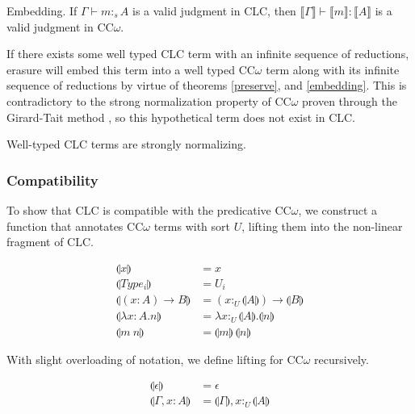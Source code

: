 \documentclass[sigplan,screen,review,anonymous]{acmart}
\newcommand{\utype}{:_{\scriptscriptstyle U}}
\newcommand{\stype}[1]{:_#1}
\newcommand{\erase}[1]{\llbracket #1 \rrbracket}
\newcommand{\lift}[1]{\llparenthesis #1 \rrparenthesis}
\begin{document}
\begin{theorem} \label{embedding}
  Embedding. If $\Gamma \vdash m \stype{s} A$ is a valid judgment in CLC, then $\erase{\Gamma} \vdash \erase{m} : \erase{A}$ is a valid judgment in CC$\omega$.
\end{theorem}

If there exists some well typed CLC term with an infinite sequence of reductions, erasure will embed this term into a well typed CC$\omega$ term along with its infinite sequence of reductions by virtue of theorems \ref{preserve}, and \ref{embedding}. This is contradictory to the strong normalization property of CC$\omega$ proven through the Girard-Tait method \cite{ecc}, so this hypothetical term does not exist in CLC.

\begin{theorem}
  Well-typed CLC terms are strongly normalizing.
\end{theorem}

\subsubsection{Compatibility}
To show that CLC is compatible with the predicative CC$\omega$, we construct a function that annotates CC$\omega$ terms with sort $U$, lifting them into the non-linear fragment of CLC.

\begin{definition}
  \begin{align*}
    \lift{x}                     & = x                                        \\
    \lift{Type_i}                & = U_i                                      \\
    \lift{(x : A) \rightarrow B} & = (x \utype \lift{A}) \rightarrow \lift{B} \\
    \lift{\lambda x : A.n}       & = \lambda x\utype\lift{A}.\lift{n}         \\
    \lift{m\ n}                  & = \lift{m}\ \lift{n}
  \end{align*}
\end{definition}

With slight overloading of notation, we define lifting for CC$\omega$ recursively.
\begin{definition}
  \begin{align*}
    \lift{\epsilon}      & = \epsilon                         \\
    \lift{\Gamma, x : A} & = \lift{\Gamma}, x \utype \lift{A}
  \end{align*}
\end{definition}
\end{document}
